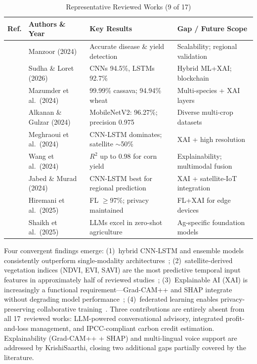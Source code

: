 \documentclass[conference]{IEEEtran}
\begin{document}
\begin{table}[!t]
\caption{Representative Reviewed Works (9 of 17)}
\label{tab:lr1}
\centering
\renewcommand{\arraystretch}{1.2}
\begin{tabular}{|c|p{1.55cm}|p{2.1cm}|p{2.1cm}|}
\hline
\textbf{Ref.} & \textbf{Authors \& Year} & \textbf{Key Results} & \textbf{Gap / Future Scope} \\
\hline
\cite{b16} & Manzoor (2024) & Accurate disease \& yield detection & Scalability; regional validation \\
\hline
\cite{b22} & Sudha \& Loret (2026) & CNNs 94.5\%, LSTMs 92.7\% & Hybrid ML+XAI; blockchain \\
\hline
\cite{b10} & Mazumder et al.\ (2024) & 99.99\% cassava; 94.94\% wheat & Multi-species + XAI layers \\
\hline
\cite{b8}  & Alkanan \& Gulzar (2024) & MobileNetV2: 96.27\%; precision 0.975 & Diverse multi-crop datasets \\
\hline
\cite{b21} & Meghraoui et al.\ (2024) & CNN-LSTM dominates; satellite $\sim$50\% & XAI + high resolution \\
\hline
\cite{b4}  & Wang et al.\ (2024) & $R^2$ up to 0.98 for corn yield & Explainability; multimodal fusion \\
\hline
\cite{b13} & Jabed \& Murad (2024) & CNN-LSTM best for regional prediction & XAI + satellite-IoT integration \\
\hline
\cite{b14} & Hiremani et al.\ (2025) & FL $\geq$97\%; privacy maintained & FL+XAI for edge devices \\
\hline
\cite{b20} & Shaikh et al.\ (2025) & LLMs excel in zero-shot agriculture & Ag-specific foundation models \\
\hline
\end{tabular}
\end{table}

Four convergent findings emerge: (1)~hybrid CNN-LSTM and ensemble models consistently outperform single-modality architectures~\cite{b4,b13,b21}; (2)~satellite-derived vegetation indices (NDVI, EVI, SAVI) are the most predictive temporal input features in approximately half of reviewed studies~\cite{b21}; (3)~Explainable AI (XAI) is increasingly a functional requirement---Grad-CAM++ and SHAP integrate without degrading model performance~\cite{b4,b10}; (4)~federated learning enables privacy-preserving collaborative training~\cite{b14}. Three contributions are entirely absent from all 17~reviewed works: LLM-powered conversational advisory, integrated profit-and-loss management, and IPCC-compliant carbon credit estimation. Explainability (Grad-CAM++ + SHAP) and multi-lingual voice support are addressed by KrishiSaarthi, closing two additional gaps partially covered by the literature.
\end{document}
